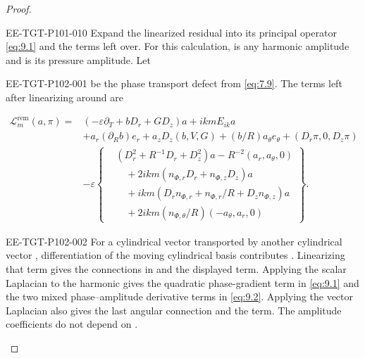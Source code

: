 \begin{proof}
\begin{EESegment}{EE-TGT-P101-010}
Expand the linearized residual into its principal operator \eqref{eq:9.1} and the terms left over.
For this calculation,  is any harmonic amplitude and
 is its pressure amplitude. Let
\end{EESegment}
%
\begin{EESegment}{EE-TGT-P102-001}
 be the phase
transport defect from \eqref{eq:7.9}. The terms left after linearizing around
 are
\end{EESegment}
\begin{equation}
\begin{aligned}
\mathscr L_m^{\mathrm{rem}}(a,\pi)={}&
 (-\varepsilon\partial_T+bD_r+GD_z)a+ikmE_{ik}a\\
&+a_r(\partial_Rb)e_r+a_zD_z(b,V,G)+(b/R)a_\theta e_\theta
 +(D_r\pi,0,D_z\pi)\\
&-\varepsilon\left\{
\begin{aligned}
 &(D_r^2+R^{-1}D_r+D_z^2)a-R^{-2}(a_r,a_\theta,0)\\
 &\quad+2ikm(n_{\Phi,r}D_r+n_{\Phi,z}D_z)a\\
 &\quad+ikm(D_rn_{\Phi,r}+n_{\Phi,r}/R+D_zn_{\Phi,z})a\\
 &\quad+2ikm(n_{\Phi,\theta}/R)(-a_\theta,a_r,0)
\end{aligned}
\right\}.
\end{aligned}
\tag{9.2}\label{eq:9.2}
\end{equation}
\begin{EESegment}{EE-TGT-P102-002}
For a cylindrical vector  transported by another cylindrical vector
, differentiation of the moving cylindrical basis contributes
. Linearizing that term gives the
connections in  and the displayed
 term. Applying the scalar Laplacian to the harmonic gives the quadratic
phase-gradient term in \eqref{eq:9.1} and the two mixed phase--amplitude derivative terms in
\eqref{eq:9.2}. Applying the vector Laplacian also gives the last angular connection and the
 term. The amplitude coefficients do not depend on
.
\end{EESegment}


\end{proof}
